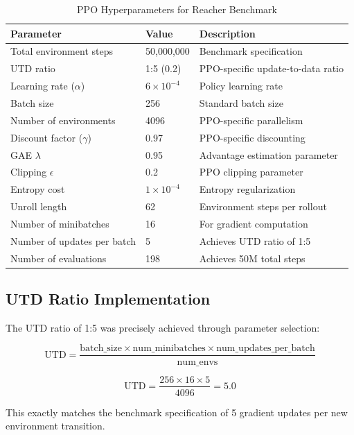 \documentclass[conference]{IEEEtran}
\begin{document}
\begin{table}[htbp]
\centering
\caption{PPO Hyperparameters for Reacher Benchmark}
\label{tab:hyperparams}
\begin{tabular}{@{}lll@{}}
\toprule
\textbf{Parameter} & \textbf{Value} & \textbf{Description} \\
\midrule
Total environment steps & 50,000,000 & Benchmark specification \\
UTD ratio & 1:5 (0.2) & PPO-specific update-to-data ratio \\
Learning rate ($\alpha$) & $6 \times 10^{-4}$ & Policy learning rate \\
Batch size & 256 & Standard batch size \\
Number of environments & 4096 & PPO-specific parallelism \\
Discount factor ($\gamma$) & 0.97 & PPO-specific discounting \\
GAE $\lambda$ & 0.95 & Advantage estimation parameter \\
Clipping $\epsilon$ & 0.2 & PPO clipping parameter \\
Entropy cost & $1 \times 10^{-4}$ & Entropy regularization \\
Unroll length & 62 & Environment steps per rollout \\
Number of minibatches & 16 & For gradient computation \\
Number of updates per batch & 5 & Achieves UTD ratio of 1:5 \\
Number of evaluations & 198 & Achieves 50M total steps \\
\bottomrule
\end{tabular}
\end{table}

\subsection{UTD Ratio Implementation}
The UTD ratio of 1:5 was precisely achieved through parameter selection:

\begin{equation}
\text{UTD} = \frac{\text{batch\_size} \times \text{num\_minibatches} \times \text{num\_updates\_per\_batch}}{\text{num\_envs}}
\end{equation}

\begin{equation}
\text{UTD} = \frac{256 \times 16 \times 5}{4096} = 5.0
\end{equation}

This exactly matches the benchmark specification of 5 gradient updates per new environment transition.
\end{document}
